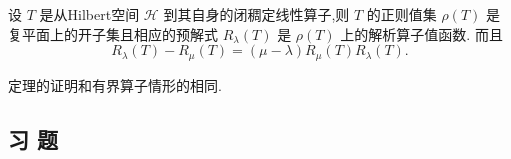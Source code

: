 \documentclass[lang=cn,newtx,10pt,scheme=chinese,thmcnt=chapter]{elegantbook}
\begin{document}
\begin{theorem}
    设 \(T\) 是从Hilbert空间 \(\mathcal{H}\) 到其自身的闭稠定线性算子,则 \(T\) 的正则值集 \(\rho \left( T\right)\) 是复平面上的开子集且相应的预解式 \({R}_{\lambda }\left( T\right)\) 是 \(\rho \left( T\right)\) 上的解析算子值函数. 而且
\begin{equation*}
{R}_{\lambda }\left( T\right)  - {R}_{\mu }\left( T\right)  = \left( {\mu  - \lambda }\right) {R}_{\mu }\left( T\right) {R}_{\lambda }\left( T\right) .
\end{equation*}

定理的证明和有界算子情形的相同.
\end{theorem}

\subsection{习 题}
\end{document}
